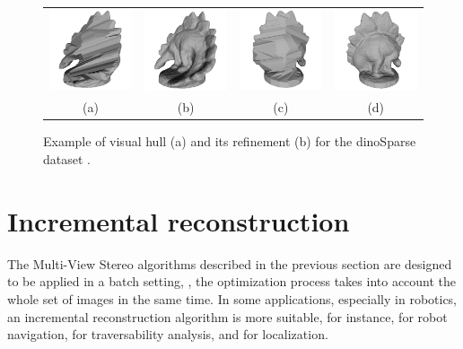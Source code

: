 \begin{figure}[t]
\centering
 \begin{tabular}{cccc}
  \includegraphics[width=0.24\columnwidth]{./img/ch_soa/dinoHull01}&
  \includegraphics[width=0.24\columnwidth]{./img/ch_soa/dinoRef01}&
  \includegraphics[width=0.24\columnwidth]{./img/ch_soa/dinoHull02}&
  \includegraphics[width=0.24\columnwidth]{./img/ch_soa/dinoRef02}\\
  (a)&(b)&(c)&(d)
 \end{tabular}
 \caption{Example of visual hull (a) and its refinement (b) for the dinoSparse dataset \cite{seitz_et_al06}.}
 \label{fig:visualhullex}
\end{figure}
\section{Incremental reconstruction} 
The Multi-View Stereo algorithms described in the previous section are designed to be applied in a batch setting, \ie, the optimization process takes into account the whole set of images in the same time.
In some applications, especially in robotics, an incremental reconstruction algorithm is more suitable, for instance, for robot navigation, for traversability analysis, and for localization.
